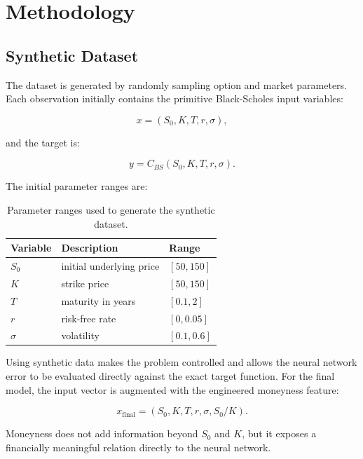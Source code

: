 \chapter{Methodology}

\section{Synthetic Dataset}

The dataset is generated by randomly sampling option and market parameters.
Each observation initially contains the primitive Black-Scholes input variables:

\begin{equation}
    x = (S_0, K, T, r, \sigma),
\end{equation}

and the target is:

\begin{equation}
    y = C_{BS}(S_0, K, T, r, \sigma).
\end{equation}

The initial parameter ranges are:

\begin{table}[H]
    \centering
    \begin{tabular}{lll}
        \toprule
        Variable & Description & Range \\
        \midrule
        $S_0$ & initial underlying price & $[50, 150]$ \\
        $K$ & strike price & $[50, 150]$ \\
        $T$ & maturity in years & $[0.1, 2]$ \\
        $r$ & risk-free rate & $[0, 0.05]$ \\
        $\sigma$ & volatility & $[0.1, 0.6]$ \\
        \bottomrule
    \end{tabular}
    \caption{Parameter ranges used to generate the synthetic dataset.}
\end{table}

Using synthetic data makes the problem controlled and allows the neural network error to be evaluated directly against the exact target function.
For the final model, the input vector is augmented with the engineered moneyness feature:

\begin{equation}
    x_{\mathrm{final}} = (S_0, K, T, r, \sigma, S_0/K).
\end{equation}

Moneyness does not add information beyond $S_0$ and $K$, but it exposes a financially meaningful relation directly to the neural network.

